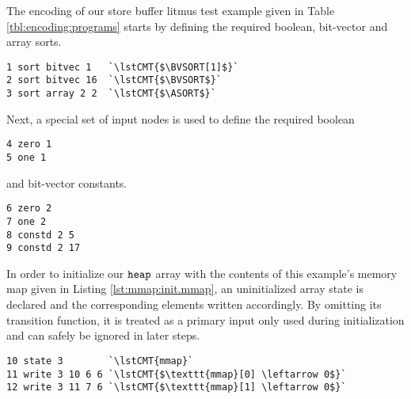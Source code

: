 The encoding of our store buffer litmus test example given in Table \ref{tbl:encoding:programs} starts by defining the required boolean, bit-vector and array sorts.
\begin{lstlisting}[style=btor2]
1 sort bitvec 1   `\lstCMT{$\BVSORT[1]$}`
2 sort bitvec 16  `\lstCMT{$\BVSORT$}`
3 sort array 2 2  `\lstCMT{$\ASORT$}`
\end{lstlisting}
Next, a special set of input nodes is used to define the required boolean
\begin{lstlisting}[style=btor2]
4 zero 1
5 one 1
\end{lstlisting}
and bit-vector constants.
\begin{lstlisting}[style=btor2]
6 zero 2
7 one 2
8 constd 2 5
9 constd 2 17
\end{lstlisting}

\noindent
In order to initialize our $\texttt{heap}$ array with the contents of this example's memory map given in Listing \ref{lst:mmap:init.mmap}, an uninitialized array state is declared and the corresponding elements written accordingly.
By omitting its transition function, it is treated as a primary input only used during initialization and can safely be ignored in later steps.
\begin{lstlisting}[style=btor2]
10 state 3        `\lstCMT{mmap}`
11 write 3 10 6 6 `\lstCMT{$\texttt{mmap}[0] \leftarrow 0$}`
12 write 3 11 7 6 `\lstCMT{$\texttt{mmap}[1] \leftarrow 0$}`
\end{lstlisting}

